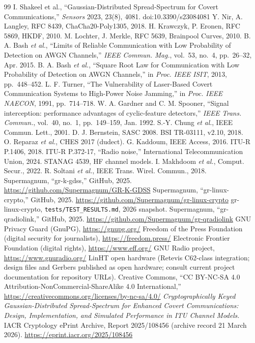 \documentclass[10pt,a4paper,twocolumn]{article}
\begin{document}
\begin{thebibliography}{99}
 I. Shakeel et al., ``Gaussian-Distributed Spread-Spectrum for Covert Communications,'' \textit{Sensors} 2023, 23(8), 4081. doi:10.3390/s23084081
 Y. Nir, A. Langley, RFC 8439, ChaCha20-Poly1305, 2018.
 H. Krawczyk, P. Eronen, RFC 5869, HKDF, 2010.
 M. Lochter, J. Merkle, RFC 5639, Brainpool Curves, 2010.
 B. A. Bash \textit{et al.}, ``Limits of Reliable Communication with Low Probability of Detection on AWGN Channels,'' \textit{IEEE Commun. Mag.}, vol.~53, no.~4, pp.~26--32, Apr. 2015.
 B. A. Bash \textit{et al.}, ``Square Root Law for Communication with Low Probability of Detection on AWGN Channels,'' in \textit{Proc. IEEE ISIT}, 2013, pp.~448--452.
 L. F. Turner, ``The Vulnerability of Laser-Based Covert Communication Systems to High-Power Noise Jamming,'' in \textit{Proc. IEEE NAECON}, 1991, pp.~714--718.
 W. A. Gardner and C. M. Spooner, ``Signal interception: performance advantages of cyclic-feature detectors,'' \textit{IEEE Trans. Commun.}, vol.~40, no.~1, pp.~149--159, Jan. 1992.
 S.-Y. Chung \textit{et al.}, IEEE Commun. Lett., 2001.
 D. J. Bernstein, SASC 2008.
 BSI TR-03111, v2.10, 2018.
 O. Reparaz \textit{et al.}, CHES 2017 (dudect).
 G. Kaddoum, IEEE Access, 2016.
 ITU-R P.1406, 2018.
 ITU-R P.372-17, ``Radio noise,'' International Telecommunication Union, 2024.
 STANAG 4539, HF channel models.
 I. Makhdoom \textit{et al.}, Comput. Secur., 2022.
 R. Soltani \textit{et al.}, IEEE Trans. Wirel. Commun., 2018.
 Supermagnum, ``gr-k-gdss,'' GitHub, 2025. \url{https://github.com/Supermagnum/GR-K-GDSS}
 Supermagnum, ``gr-linux-crypto,'' GitHub, 2025. \url{https://github.com/Supermagnum/gr-linux-crypto}
 gr-linux-crypto, \texttt{tests/TEST\_RESULTS.md}, 2026 snapshot.
 Supermagnum, ``gr-qradiolink,'' GitHub, 2025. \url{https://github.com/Supermagnum/gr-qradiolink}
 GNU Privacy Guard (GnuPG), \url{https://gnupg.org/}
 Freedom of the Press Foundation (digital security for journalists), \url{https://freedom.press/}
 Electronic Frontier Foundation (digital rights), \url{https://www.eff.org/}
 GNU Radio project, \url{https://www.gnuradio.org/}
 LinHT open hardware (Retevis C62-class integration; design files and Gerbers published as open hardware; consult current project documentation for repository URLs).
 Creative Commons, ``CC BY-NC-SA 4.0 Attribution-NonCommercial-ShareAlike 4.0 International,'' \url{https://creativecommons.org/licenses/by-nc-sa/4.0/}
 \textit{Cryptographically Keyed Gaussian-Distributed Spread-Spectrum for Enhanced Covert Communications: Design, Implementation, and Simulated Performance in ITU Channel Models.} IACR Cryptology ePrint Archive, Report 2025/108456 (archive record 21 March 2026). \url{https://eprint.iacr.org/2025/108456}
\end{thebibliography}
\end{document}
